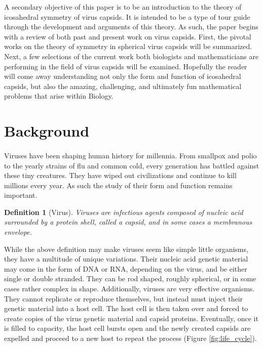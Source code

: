 \documentclass[12pt,letter]{article}
\newtheorem*{definition*}{Definition}
\begin{document}
A secondary objective of this paper is to be an introduction to the theory of icosahedral symmetry of virus capsids. It is intended to be a type of tour guide through the development and arguments of this theory. As such, the paper begins with a review of both past and present work on virus capsids. First, the pivotal works on the theory of symmetry in spherical virus capsids will be summarized. Next, a few selections of the current work both biologists and mathematicians are performing in the field of virus capsids will be examined. Hopefully the reader will come away understanding not only the form and function of icosahedral capsids, but also the amazing, challenging, and ultimately fun mathematical problems that arise within Biology. 

\section{Background} %

\paragraph{}
Viruses have been shaping human history for millennia. From smallpox and polio to the yearly strains of flu and common cold, every generation has battled against these tiny creatures. They have wiped out civilizations and continue to kill millions every year. As such the study of their form and function remains important.

\begin{definition*}[Virus]
Viruses are infectious agents composed of nucleic acid surrounded by a protein shell, called a capsid, and in some cases a membranous envelope. 
\end{definition*}
While the above definition may make viruses seem like simple little organisms, they have a multitude of unique variations. Their nucleic acid genetic material may come in the form of DNA or RNA, depending on the virus, and be either single or double stranded. They can be rod shaped, roughly spherical, or in some cases rather complex in shape. Additionally, viruses are very effective organisms. They cannot replicate or reproduce themselves, but instead must inject their genetic material into a host cell. The host cell is then taken over and forced to create copies of the virus genetic material and capsid proteins. Eventually, once it is filled to capacity, the host cell bursts open and the newly created capsids are expelled and proceed to a new host to repeat the process (Figure \ref{fig:life_cycle}). \cite{Campbell:2002}
\end{document}
